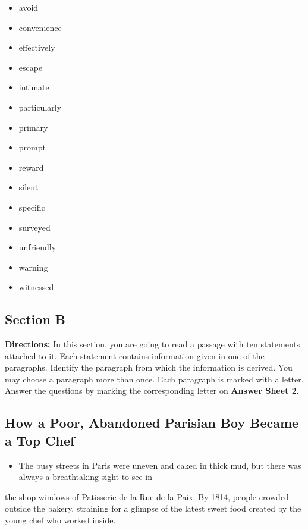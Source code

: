 \documentclass[UTF8,11pt]{ctexart}
\begin{document}
\begin{itemize}[leftmargin=2em,itemsep=.2em,topsep=.4em]\item[A.] avoid
\item[B.] convenience
\item[C.] effectively
\item[D.] escape
\item[E.] intimate
\item[F.] particularly
\item[G.] primary
\item[H.] prompt
\item[I.] reward
\item[J.] silent
\item[K.] specific
\item[L.] surveyed
\item[M.] unfriendly
\item[N.] warning
\item[O.] witnessed
\end{itemize}

\subsection*{\textbf{Section B}}


\textbf{Directions:} In this section, you are going to read a passage with ten statements attached to it. Each statement contains information given in one of the paragraphs. Identify the paragraph from which the information is derived. You may choose a paragraph more than once. Each paragraph is marked with a letter. Answer the questions by marking the corresponding letter on\textbf{ Answer Sheet 2}.


\subsection*{\textbf{How a Poor, Abandoned Parisian Boy Became a Top Chef}}


\begin{itemize}[leftmargin=2em,itemsep=.2em,topsep=.4em]\item[A.] The busy streets in Paris were uneven and caked in thick mud, but there was always a breathtaking sight to see in
\end{itemize}

the shop windows of Patisserie de la Rue de la Paix. By 1814, people crowded outside the bakery, straining for a glimpse of the latest sweet food created by the young chef who worked inside.
\end{document}
